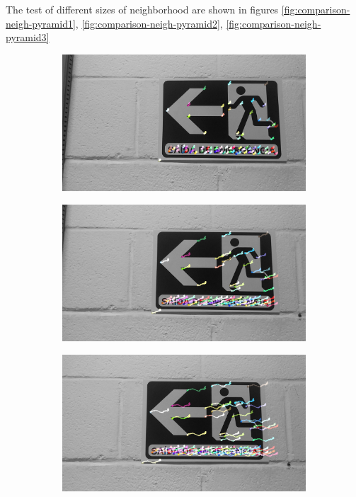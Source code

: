 The test of different sizes of neighborhood are shown in figures \ref{fig:comparison-neigh-pyramid1}, \ref{fig:comparison-neigh-pyramid2}, \ref{fig:comparison-neigh-pyramid3}

\begin{figure}[!h]
	\hspace{-1cm}
	\begin{subfigure}{0.33\textwidth}
	  \centering
	  \includegraphics[width=0.99\linewidth]{figs/flow5x5-1.jpg}
	\end{subfigure}%
	\begin{subfigure}{0.33\textwidth}
	  \centering
	  \includegraphics[width=0.99\linewidth]{figs/flow5x5-2.jpg}
	 
	\end{subfigure}%
	\begin{subfigure}{0.33\textwidth}
        \centering
      \includegraphics[width=0.99\linewidth]{figs/flow5x5-3.jpg}
    \end{subfigure}
    \endminipage\hfill
    

\end{figure}
